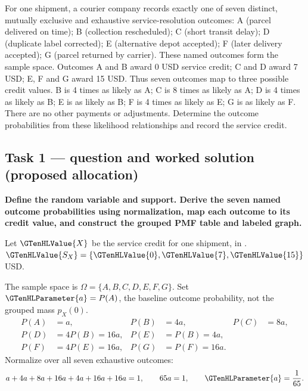 For one shipment, a courier company records exactly one of seven distinct, mutually exclusive and exhaustive service-resolution outcomes: A (parcel delivered on time); B (collection rescheduled); C (short transit delay); D (duplicate label corrected); E (alternative depot accepted); F (later delivery accepted); G (parcel returned by carrier). These named outcomes form the sample space. Outcomes A and B award 0 USD service credit; C and D award 7 USD; E, F and G award 15 USD. Thus seven outcomes map to three possible credit values. B is 4 times as likely as A; C is 8 times as likely as A; D is 4 times as likely as B; E is as likely as B; F is 4 times as likely as E; G is as likely as F. There are no other payments or adjustments. Determine the outcome probabilities from these likelihood relationships and record the service credit.

\subsection*{Task 1 --- question and worked solution (proposed allocation) }
\label{sol:q5t1}

\noindent\textbf{\boldmath Define the random variable and support. Derive the seven named outcome probabilities using normalization, map each outcome to its credit value, and construct the grouped PMF table and labeled graph.}\par\nopagebreak

Let $\GTenHLValue{X}$ be the service credit for one shipment, in . $\GTenHLValue{S_X}=\{\GTenHLValue{0},\GTenHLValue{7},\GTenHLValue{15}\}$ USD.

The sample space is $\Omega=\{A,B,C,D,E,F,G\}$. Set $\GTenHLParameter{a}=P(A)$, the baseline outcome probability, not the grouped mass $p_X(0)$.
\begin{align*}P(A)&=a,&P(B)&=4a,&P(C)&=8a,\\P(D)&=4P(B)=16a,&P(E)&=P(B)=4a,\\P(F)&=4P(E)=16a,&P(G)&=P(F)=16a.\end{align*}
Normalize over all seven exhaustive outcomes:
\[a+4a+8a+16a+4a+16a+16a=1,\qquad 65a=1,\qquad \GTenHLParameter{a}=\frac1{65}.\]

